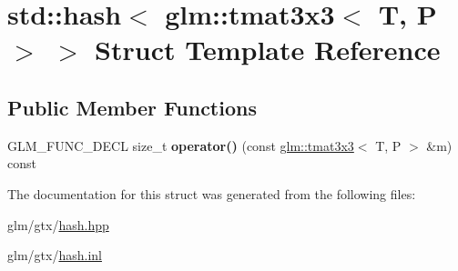 \hypertarget{structstd_1_1hash_3_01glm_1_1tmat3x3_3_01T_00_01P_01_4_01_4}{\section{std\-:\-:hash$<$ glm\-:\-:tmat3x3$<$ T, P $>$ $>$ Struct Template Reference}
\label{structstd_1_1hash_3_01glm_1_1tmat3x3_3_01T_00_01P_01_4_01_4}
}
\subsection*{Public Member Functions}
\begin{DoxyCompactItemize}
\item 
\hypertarget{structstd_1_1hash_3_01glm_1_1tmat3x3_3_01T_00_01P_01_4_01_4_a39ad283ffeb240e2a63a44bda719a1bb}{G\-L\-M\-\_\-\-F\-U\-N\-C\-\_\-\-D\-E\-C\-L size\-\_\-t {\bfseries operator()} (const \hyperlink{structglm_1_1tmat3x3}{glm\-::tmat3x3}$<$ T, P $>$ \&m) const }\label{structstd_1_1hash_3_01glm_1_1tmat3x3_3_01T_00_01P_01_4_01_4_a39ad283ffeb240e2a63a44bda719a1bb}

\end{DoxyCompactItemize}


The documentation for this struct was generated from the following files\-:\begin{DoxyCompactItemize}
\item 
glm/gtx/\hyperlink{hash_8hpp}{hash.\-hpp}\item 
glm/gtx/\hyperlink{hash_8inl}{hash.\-inl}\end{DoxyCompactItemize}
